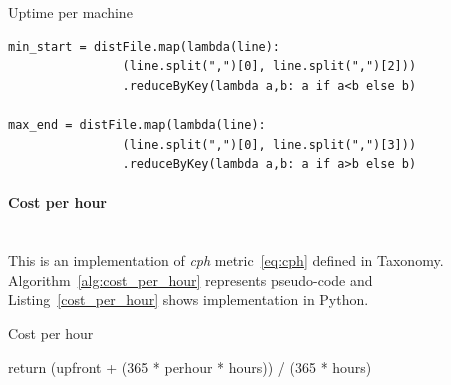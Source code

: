 \documentclass[]{final_report}
\newcommand{\myparagraph}[1]{\paragraph{#1}\mbox{}\\}
\begin{document}
\begin{algorithm}[h]
\caption{Uptime per machine}
\label{alg:uptime_per_machine}
 \algrenewcommand{}
 \algrenewcommand{}
\end{algorithm}

\begin{minipage}{\linewidth}
\begin{lstlisting}[label={uptime_per_machine_implementation},caption={Uptime per machine implementation in Apache Spark},frame=single] 
min_start = distFile.map(lambda(line): 
                (line.split(",")[0], line.split(",")[2]))
                .reduceByKey(lambda a,b: a if a<b else b)

max_end = distFile.map(lambda(line): 
                (line.split(",")[0], line.split(",")[3]))
                .reduceByKey(lambda a,b: a if a>b else b)
\end{lstlisting}
\end{minipage}

\myparagraph{Cost per hour}

This is an implementation of \textit{cph} metric~\ref{eq:cph} defined in Taxonomy. Algorithm~\ref{alg:cost_per_hour} represents pseudo-code and Listing~\ref{cost_per_hour} shows implementation in Python.

\begin{algorithm}[H]
 \caption{Cost per hour}
 \label{alg:cost_per_hour}
 return (upfront + (365 * perhour * hours)) / (365 * hours)
\end{algorithm}
\end{document}
